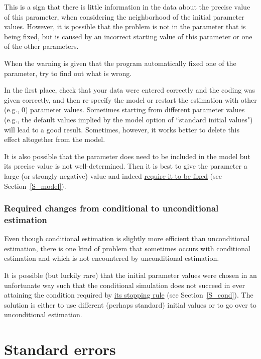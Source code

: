 \documentclass[a4paper,fleqn,11pt]{article}
\newcommand{\+}{\, + \,}
\begin{document}
This is a sign that there is little information in the data about
the precise value of this parameter, when considering the
neighborhood of the initial parameter values. However, it is
possible that the problem is not in the parameter that is being
fixed, but is caused by an incorrect starting value of this
parameter or one of the other parameters.

When the warning is given that the program automatically fixed one
of the parameter, try to find out what is wrong.

In the first place, check that your data were entered correctly
and the coding was given correctly, and then re-specify the model
or restart the estimation with other (e.g., 0) parameter values.
Sometimes starting from different parameter values (e.g., the
default values implied by the model option
of ``standard initial values") will lead to a good result.
Sometimes, however, it works better to delete this effect
altogether from the model.

It is also possible that the parameter does need to be included in
the model but its precise value is not well-determined. Then it is
best to give the parameter a large (or strongly negative) value
and indeed
\hyperlink{T_fix}{require it to be fixed}
(see Section~\ref{S_model}).


\subsubsection{Required changes from conditional to unconditional estimation}

Even though conditional estimation is slightly more efficient than
unconditional estimation, there is one kind of problem that
sometimes occurs with conditional estimation and which is not
encountered by unconditional estimation.

It is possible (but luckily rare) that the initial parameter
values were chosen in an unfortunate way such that the conditional
simulation does not succeed in ever attaining the condition required
by \hyperlink{T_distance_stop}{its stopping rule} (see
Section~\ref{S_cond}).
The solution is either to use different
(perhaps standard) initial values or to go over to
unconditional estimation.


\newpage
\hypertarget{T_se}{
\section{Standard errors}
}
\label{S_se}
\end{document}
